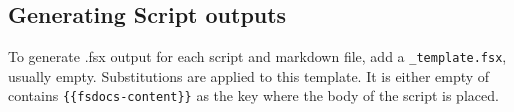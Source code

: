 \documentclass{article}
\begin{document}
\subsection*{Generating Script outputs}



To generate .fsx output for each script and markdown file, add a \texttt{\_template.fsx}, usually empty. Substitutions are
applied to this template. It is either empty of contains \texttt{\{\{fsdocs-content\}\}} as the key where the body
of the script is placed.
\end{document}
